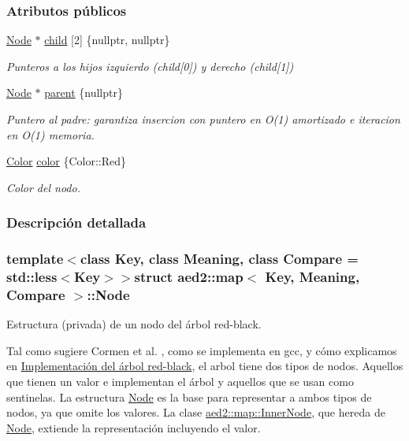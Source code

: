 \subsubsection*{Atributos públicos}
\begin{DoxyCompactItemize}
\item 
\hyperlink{structaed2_1_1map_1_1Node}{Node} $\ast$ \hyperlink{structaed2_1_1map_1_1Node_a7d65c374c73c443a46d8fc224aff9e82_a7d65c374c73c443a46d8fc224aff9e82}{child} \mbox{[}2\mbox{]} \{nullptr, nullptr\}
\begin{DoxyCompactList}\small\item\em Punteros a los hijos izquierdo (child\mbox{[}0\mbox{]}) y derecho (child\mbox{[}1\mbox{]}) \end{DoxyCompactList}\item 
\hyperlink{structaed2_1_1map_1_1Node}{Node} $\ast$ \hyperlink{structaed2_1_1map_1_1Node_ab6a5f9e471b311755e4a56834086cb90_ab6a5f9e471b311755e4a56834086cb90}{parent} \{nullptr\}
\begin{DoxyCompactList}\small\item\em Puntero al padre\-: garantiza insercion con puntero en O(1) amortizado e iteracion en O(1) memoria. \end{DoxyCompactList}\item 
\hyperlink{classaed2_1_1map_a6d62a415a4b9d320b30cada4ebcf9f5b_a6d62a415a4b9d320b30cada4ebcf9f5b}{Color} \hyperlink{structaed2_1_1map_1_1Node_a58dd9993fee8ee3eaa5716b72a3eca47_a58dd9993fee8ee3eaa5716b72a3eca47}{color} \{Color\-::\-Red\}
\begin{DoxyCompactList}\small\item\em Color del nodo. \end{DoxyCompactList}\end{DoxyCompactItemize}


\subsubsection{Descripción detallada}
\subsubsection*{template$<$class Key, class Meaning, class Compare = std\-::less$<$\-Key$>$$>$struct aed2\-::map$<$ Key, Meaning, Compare $>$\-::\-Node}

Estructura (privada) de un nodo del árbol red-\/black. 

Tal como sugiere Cormen et al. \cite{CormenLeisersonRivestStein2009}, como se implementa en gcc, y cómo explicamos en \hyperlink{Implementacion}{Implementación del árbol red-\/black}, el arbol tiene dos tipos de nodos. Aquellos que tienen un valor e implementan el árbol y aquellos que se usan como sentinelas. La estructura \hyperlink{structaed2_1_1map_1_1Node}{Node} es la base para representar a ambos tipos de nodos, ya que omite los valores. La clase \hyperlink{structaed2_1_1map_1_1InnerNode}{aed2\-::map\-::\-Inner\-Node}, que hereda de \hyperlink{structaed2_1_1map_1_1Node}{Node}, extiende la representación incluyendo el valor.

